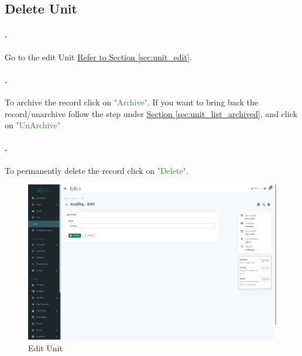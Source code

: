 \subsection{Delete Unit}
\setcounter{stepcounter}{1}
\paragraph{.}Go to the edit Unit \hyperref[sec:unit_edit]{Refer to Section \ref{sec:unit_edit}}.

\paragraph{.}To archive the record click on \textcolor{ForestGreen}{"Archive"}. If you want to bring back the record/unarchive follow the step under \hyperref[sec:unit_list_archived]{Section  \ref{sec:unit_list_archived}}, and click on \textcolor{ForestGreen}{"UnArchive"}


\paragraph{.}To permanently delete the record click on \textcolor{ForestGreen}{"Delete"}.

\begin{figure}[h!]
  	\includegraphics[width=15cm]{screenshots/unit_edit_page.png}
  	\caption{Edit Unit}
  	\label{fig:unit_edit_page}
\end{figure}